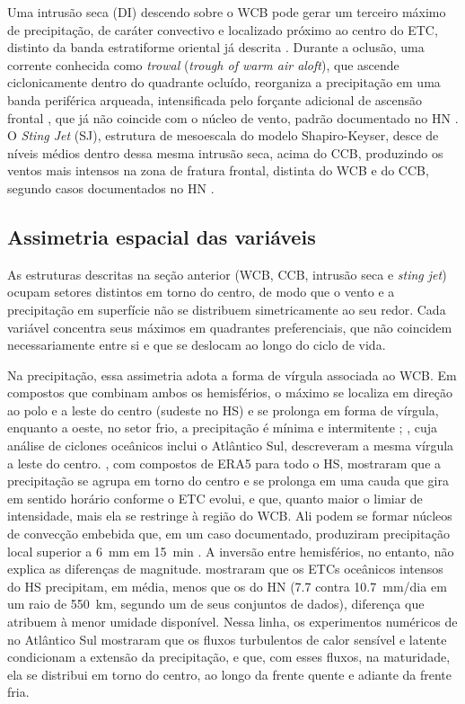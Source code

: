 Uma intrusão seca (DI) descendo sobre o WCB pode gerar um terceiro máximo de precipitação, de caráter convectivo e localizado próximo ao centro do ETC, distinto da banda estratiforme oriental já descrita \citep{sawada2021heavy}.
Durante a oclusão, uma corrente conhecida como \textit{trowal} (\textit{trough of warm air aloft}), que ascende ciclonicamente dentro do quadrante ocluído, reorganiza a precipitação em uma banda periférica arqueada, intensificada pelo forçante adicional de ascensão frontal \citep{naud2025lifecycle}, que já não coincide com o núcleo de vento, padrão documentado no HN \citep{martin1999forcing}.
O \textit{Sting Jet} (SJ), estrutura de mesoescala do modelo Shapiro-Keyser, desce de níveis médios dentro dessa mesma intrusão seca, acima do CCB, produzindo os ventos mais intensos na zona de fratura frontal, distinta do WCB e do CCB, segundo casos documentados no HN \citep{clark2005sting, clark2018sting, martinez2014cold}.

\subsection{Assimetria espacial das variáveis}\label{subsec:tb_kde_asimetria}

As estruturas descritas na seção anterior (WCB, CCB, intrusão seca e \textit{sting jet}) ocupam setores distintos em torno do centro, de modo que o vento e a precipitação em superfície não se distribuem simetricamente ao seu redor.
Cada variável concentra seus máximos em quadrantes preferenciais, que não coincidem necessariamente entre si e que se deslocam ao longo do ciclo de vida.

Na precipitação, essa assimetria adota a forma de vírgula associada ao WCB.
Em compostos que combinam ambos os hemisférios, o máximo se localiza em direção ao polo e a leste do centro (sudeste no HS) e se prolonga em forma de vírgula, enquanto a oeste, no setor frio, a precipitação é mínima e intermitente \citep{naud2020evaluation}; \citet{field2007precipitation}, cuja análise de ciclones oceânicos inclui o Atlântico Sul, descreveram a mesma vírgula a leste do centro.
\citet{mcerlich2023extremes}, com compostos de ERA5 para todo o HS, mostraram que a precipitação se agrupa em torno do centro e se prolonga em uma cauda que gira em sentido horário conforme o ETC evolui, e que, quanto maior o limiar de intensidade, mais ela se restringe à região do WCB.
Ali podem se formar núcleos de convecção embebida que, em um caso documentado, produziram precipitação local superior a 6~mm em 15~min \citep{oertel2021warm}.
A inversão entre hemisférios, no entanto, não explica as diferenças de magnitude. \citet{kodama2019perspective} mostraram que os ETCs oceânicos intensos do HS precipitam, em média, menos que os do HN (7.7 contra 10.7~mm/dia em um raio de 550~km, segundo um de seus conjuntos de dados), diferença que atribuem à menor umidade disponível.
Nessa linha, os experimentos numéricos de \citet{gozzo2013air} no Atlântico Sul mostraram que os fluxos turbulentos de calor sensível e latente condicionam a extensão da precipitação, e que, com esses fluxos, na maturidade, ela se distribui em torno do centro, ao longo da frente quente e adiante da frente fria.


